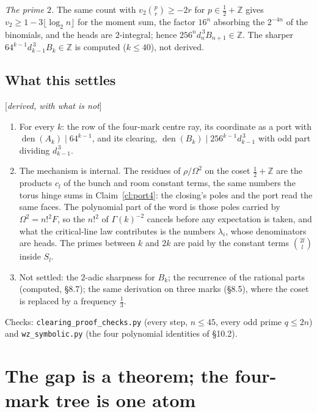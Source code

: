 \documentclass[11pt]{article}
\newcommand{\status}[1]{\hfill{\small[\textit{#1}]}}
\theoremstyle{plain}
\theoremstyle{remark}
\begin{document}
\emph{The prime $2$.} The same count with $v_2\binom pr\ge-2r$ for $p\in\frac12+\mathbb Z$ gives $v_2\ge1-3\lfloor\log_2n\rfloor$ for the moment sum, the factor $16^n$ absorbing the $2^{-4n}$ of the binomials, and the heads are $2$-integral; hence $256^nd_n^{\,3}B_{n+1}\in\mathbb Z$. The sharper $64^{k-1}d_{k-1}^{\,3}B_k\in\mathbb Z$ is computed ($k\le40$), not derived.

\subsection{What this settles}\status{derived, with what is not}

\begin{enumerate}[label=(\roman*)]
\item For every $k$: the row of the four-mark centre ray, its coordinate as a port with $\operatorname{den}(A_k)\mid64^{k-1}$, and its clearing, $\operatorname{den}(B_k)\mid256^{k-1}d_{k-1}^{\,3}$ with odd part dividing $d_{k-1}^{\,3}$.
\item The mechanism is internal. The residues of $\rho/\Omega^2$ on the coset $\frac12+\mathbb Z$ are the products $c_l$ of the bunch and room constant terms, the same numbers the torus hinge sums in Claim~\ref{cl:port4}: the closing's poles and the port read the same faces. The polynomial part of the word is those poles carried by $\Omega^2=n!^2F$, so the $n!^2$ of $\Gamma(k)^{-2}$ cancels before any expectation is taken, and what the critical-line law contributes is the numbers $\lambda_i$, whose denominators are heads. The primes between $k$ and $2k$ are paid by the constant terms $\binom{2l}l$ inside $S_l$.
\item Not settled: the $2$-adic sharpness for $B_k$; the recurrence of the rational parts (computed, \S8.7); the same derivation on three marks (\S8.5), where the coset is replaced by a frequency $\frac13$.
\end{enumerate}
Checks: \texttt{clearing\_proof\_checks.py} (every step, $n\le45$, every odd prime $q\le2n$) and \texttt{wz\_symbolic.py} (the four polynomial identities of \S10.2).

\section{The gap is a theorem; the four-mark tree is one atom}
\end{document}
